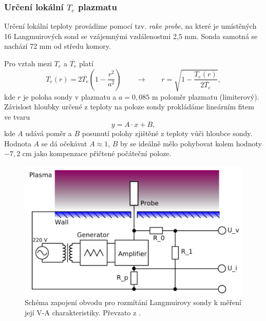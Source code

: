 \documentclass[english]{article}
\begin{document}
	
		
		\subsubsection[Určení lokální teploty plazmatu]{Určení lokální $T_e$ plazmatu}
			Určení lokální teploty provádíme pomocí tzv. \emph{rake probe}, na které je umístěných 16 Langmuirových sond se vzájemnými vzdálenostmi 2,5 mm. Sonda samotná se nachází 72 mm od středu komory. 
			
			Pro vztah mezi $T_e$ a $\overline{T_e}$ platí
			\begin{equation}
				T_e(r) = 2\overline{T_e}\left(1-\frac{r^2}{a^2}\right) \qquad\rightarrow\qquad r=\sqrt{1-\frac{T_e(r)}{2\overline{T_e}}},
				\label{eq:vztah_teplot}
			\end{equation}
			kde $r$ je poloha sondy v plazmatu a $a=0,085$ m poloměr plazmatu (limiterový). Závislost hloubky určené z teploty na poloze sondy prokládáme lineárním fitem ve tvaru
			\begin{equation}
				y=A\cdot x + B,
				\label{eq:fit_linear}
			\end{equation}				
			kde $A$ udává poměr a $B$ posunutí polohy zjištěné z teploty vůči hloubce sondy. Hodnota $A$ se dá očekávat $A\approx1$, $B$ by se ideálně mělo pohybovat kolem hodnoty $-7,2$ cm jako kompenzace přičtené počáteční poloze.
			
			\begin{figure}[h]
			\centering
			\includegraphics[width=12cm]{att/va_obvod.png}
			\caption{Schéma zapojení obvodu pro rozmítání Langmuirovy sondy k měření její V-A charakteristiky. Převzato z \cite{bib:zadani}.}
			\label{fig:s_va_obvod}
			\end{figure}					
			
\end{document}
